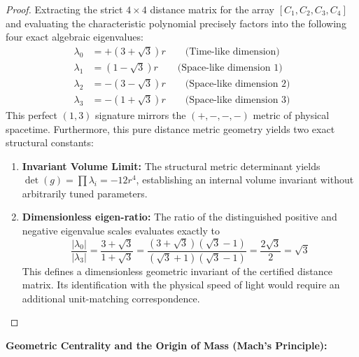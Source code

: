 \documentclass[12pt, a4paper]{article}
\begin{document}
\begin{proof}
Extracting the strict $4 \times 4$ distance matrix for the array $[C_1, C_2, C_3, C_4]$ and evaluating the characteristic polynomial precisely factors into the following four exact algebraic eigenvalues:
\begin{align*}
\lambda_0 &= +(3 + \sqrt{3})r \quad\quad \text{(Time-like dimension)} \\
\lambda_1 &= (1 - \sqrt{3})r \quad\quad \text{(Space-like dimension 1)} \\
\lambda_2 &= -(3 - \sqrt{3})r \quad\quad \text{(Space-like dimension 2)} \\
\lambda_3 &= -(1 + \sqrt{3})r \quad\quad \text{(Space-like dimension 3)}
\end{align*}
This perfect $(1,3)$ signature mirrors the $(+,-,-,-)$ metric of physical spacetime. Furthermore, this pure distance metric geometry yields two exact structural constants:
\begin{enumerate}[nosep]
    \item \textbf{Invariant Volume Limit:} The structural metric determinant yields $\det(g) = \prod \lambda_i = -12r^4$, establishing an internal volume invariant without arbitrarily tuned parameters.
    \item \textbf{Dimensionless eigen-ratio:} The ratio of the distinguished positive and negative eigenvalue scales evaluates exactly to
    \[ \frac{|\lambda_0|}{|\lambda_3|} = \frac{3+\sqrt{3}}{1+\sqrt{3}} = \frac{(3+\sqrt{3})(\sqrt{3}-1)}{(\sqrt{3}+1)(\sqrt{3}-1)} = \frac{2\sqrt{3}}{2} = \sqrt{3} \]
    This defines a dimensionless geometric invariant of the certified distance matrix. Its identification with the physical speed of light would require an additional unit-matching correspondence.
\end{enumerate}
\end{proof}

\bigskip

\noindent\textbf{Geometric Centrality and the Origin of Mass (Mach's Principle):}
\end{document}
